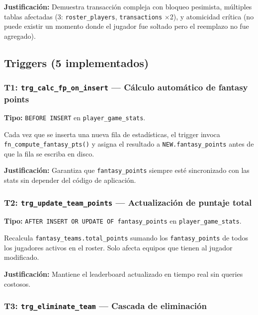 \documentclass[12pt,a4paper]{article}
\begin{document}
\textbf{Justificaci\'on:} Demuestra transacci\'on compleja con bloqueo pesimista, m\'ultiples
tablas afectadas (3: \texttt{roster\_players}, \texttt{transactions} $\times$2), y atomicidad cr\'itica
(no puede existir un momento donde el jugador fue soltado pero el reemplazo no fue agregado).

\subsection{Triggers (5 implementados)}

\subsubsection{T1: \texttt{trg\_calc\_fp\_on\_insert} --- C\'alculo autom\'atico de fantasy points}

\textbf{Tipo:} \texttt{BEFORE INSERT} en \texttt{player\_game\_stats}.

Cada vez que se inserta una nueva fila de estad\'isticas, el trigger invoca
\texttt{fn\_compute\_fantasy\_pts()} y asigna el resultado a \texttt{NEW.fantasy\_points}
antes de que la fila se escriba en disco.

\textbf{Justificaci\'on:} Garantiza que \texttt{fantasy\_points} siempre est\'e sincronizado con las
stats sin depender del c\'odigo de aplicaci\'on.

\subsubsection{T2: \texttt{trg\_update\_team\_points} --- Actualizaci\'on de puntaje total}

\textbf{Tipo:} \texttt{AFTER INSERT OR UPDATE OF fantasy\_points} en \texttt{player\_game\_stats}.

Recalcula \texttt{fantasy\_teams.total\_points} sumando los \texttt{fantasy\_points} de todos los
jugadores activos en el roster. Solo afecta equipos que tienen al jugador modificado.

\textbf{Justificaci\'on:} Mantiene el leaderboard actualizado en tiempo real sin queries costosos.

\subsubsection{T3: \texttt{trg\_eliminate\_team} --- Cascada de eliminaci\'on}
\end{document}
